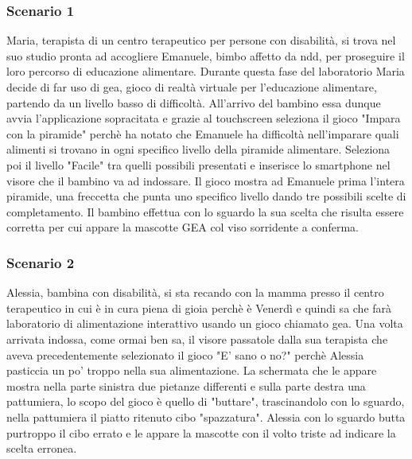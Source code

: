 \subsubsection{Scenario 1}
Maria, terapista di un centro terapeutico per persone con disabilità, si trova nel suo studio pronta ad accogliere Emanuele, bimbo affetto da \acs{ndd}, per proseguire il loro percorso di educazione alimentare. Durante questa fase del laboratorio Maria decide di far uso di \acs{gea}, gioco di realtà virtuale per l'educazione alimentare, partendo da un livello basso di difficoltà. All'arrivo del bambino essa dunque avvia l'applicazione sopracitata e grazie al touchscreen seleziona il gioco "Impara con la piramide" perchè ha notato che Emanuele ha difficoltà nell'imparare quali alimenti si trovano in ogni specifico livello della piramide alimentare. Seleziona poi il livello "Facile" tra quelli possibili presentati e inserisce lo smartphone nel visore che il bambino va ad indossare. Il gioco mostra ad Emanuele prima l'intera piramide, una freccetta che punta uno specifico livello dando tre possibili scelte di completamento. Il bambino effettua con lo sguardo la sua scelta che risulta essere corretta per cui appare la mascotte GEA col viso sorridente a conferma.
\subsubsection{Scenario 2}
Alessia, bambina con disabilità, si sta recando con la mamma presso il centro terapeutico in cui è in cura piena di gioia perchè è Venerdì e quindi sa che farà laboratorio di alimentazione interattivo usando un gioco chiamato \acs{gea}. Una volta arrivata indossa, come ormai ben sa, il visore passatole dalla sua terapista che aveva precedentemente selezionato il gioco "E' sano o no?" perchè Alessia pasticcia un po' troppo nella sua alimentazione. La schermata che le appare mostra nella parte sinistra due pietanze differenti e sulla parte destra una pattumiera, lo scopo del gioco è quello di "buttare", trascinandolo con lo sguardo, nella pattumiera il piatto ritenuto cibo "spazzatura". Alessia con lo sguardo butta purtroppo il cibo errato e le appare la mascotte con il volto triste ad indicare la scelta erronea.
\clearpage
